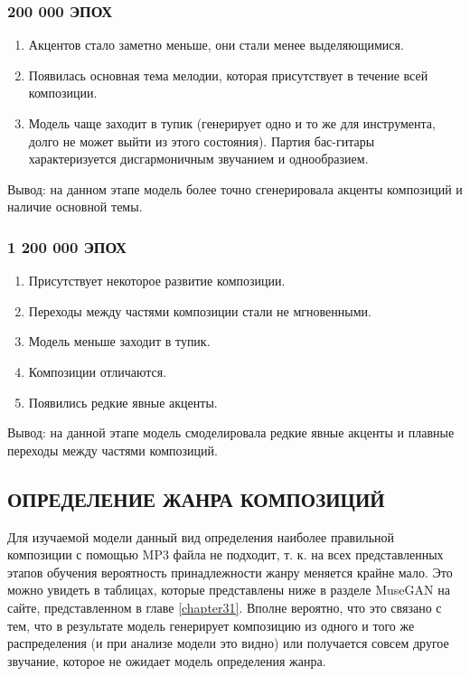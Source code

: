 \subsubsection{200 000 ЭПОХ}
\begin{enumerate}
    \item Акцентов стало заметно меньше, они стали менее выделяющимися.
    \item Появилась основная тема мелодии, которая присутствует в течение всей композиции.
    \item Модель чаще заходит в тупик (генерирует одно и то же для инструмента, долго не может выйти из этого состояния). Партия бас-гитары характеризуется дисгармоничным звучанием и однообразием. 
\end{enumerate}

Вывод: на данном этапе модель более точно сгенерировала  акценты композиций и наличие основной темы. 

\subsubsection{1 200 000 ЭПОХ}
\begin{enumerate}
    \item Присутствует некоторое развитие композиции. 
    \item Переходы между частями композиции стали не мгновенными.
    \item Модель меньше заходит в тупик.
    \item Композиции отличаются.
    \item Появились редкие явные акценты.
\end{enumerate}

Вывод: на данной этапе модель смоделировала редкие явные акценты и плавные переходы между частями композиций.

\subsection{ОПРЕДЕЛЕНИЕ ЖАНРА КОМПОЗИЦИЙ}
Для изучаемой модели данный вид определения наиболее правильной композиции с помощью MP3 файла не подходит, т. к. на всех представленных этапов обучения вероятность принадлежности жанру меняется крайне мало. Это можно увидеть в таблицах, которые представлены ниже в разделе MuseGAN на сайте, представленном в главе \ref{chapter31}. Вполне вероятно, что это связано с тем, что в результате модель генерирует композицию из одного и того же распределения (и при анализе модели это видно) или получается совсем другое звучание, которое не ожидает модель определения жанра.

